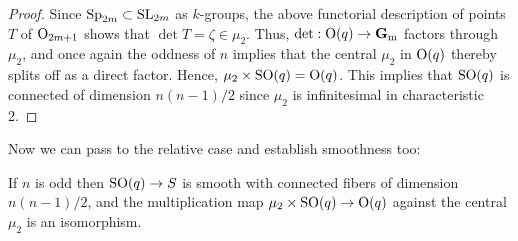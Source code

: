 \documentclass[10pt]{article}
\renewcommand{\(}{\left(}
\renewcommand{\)}{\right)}
\numberwithin{thm}{subsection}
\begin{document}
\begin{proof}
Since ${\rm{Sp}}_{2m} \subset {\rm{SL}}_{2m}$ as $k$-groups,
the above functorial description of points $T$ of ${\rm{O}}_{2m+1}$
shows that $\det T = \zeta \in \mu_2$.  Thus, $\det: {\rm{O}}(q) \rightarrow {\mathbf{G}}_{\rm{m}}$
factors through $\mu_2$, and once again the oddness of $n$
implies that the central $\mu_2$ in ${\rm{O}}(q)$ thereby splits
off as a direct factor.  Hence, $\mu_2 \times {\rm{SO}}(q) = {\rm{O}}(q)$.
This implies that ${\rm{SO}}(q)$ is connected of dimension $n(n-1)/2$
since $\mu_2$ is infinitesimal in characteristic 2.
\end{proof}

Now we can pass to the relative case and establish smoothness too:

\begin{prop} If $n$ is odd then ${\rm{SO}}(q) \rightarrow S$ is smooth
with connected fibers of dimension $n(n-1)/2$, and the multiplication map
$\mu_2 \times {\rm{SO}}(q) \rightarrow {\rm{O}}(q)$
against the central $\mu_2$ is an isomorphism.
\end{prop}
\end{document}
